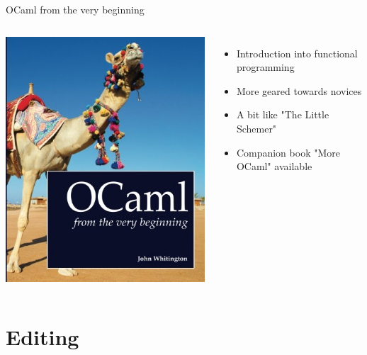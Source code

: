 \documentclass{beamer}
\begin{document}
\begin{frame}{OCaml from the very beginning}
  \begin{columns}[c]
      \includegraphics[height=0.8\textheight]{very-beginning}
      \begin{itemize}
        \item Introduction into functional programming
        \item More geared towards novices
        \item A bit like "The Little Schemer"
        \item Companion book "More OCaml" available
      \end{itemize}
  \end{columns}
\end{frame}

\section{Editing}
\end{document}
